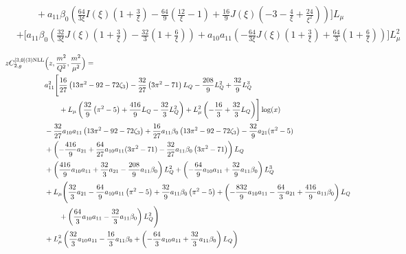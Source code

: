 \documentclass[a4paper]{article}
\begin{document}
\begin{equation}
\begin{split}
		& \qquad + a_{11} \beta_0 \left(\frac{64}{3\xi} I(\xi) \left(1 + \frac{3}{\xi}\right) - \frac{64}{9} \left(\frac{12}{\xi} - 1\right) + \frac{16}{9} J(\xi) \left(-3 - \frac{4}{\xi} + \frac{24}{\xi^2}\right)\right)\Biggr] L_\mu \\
		& + \Biggl[ a_{11} \beta_0 \left( \frac{32}{3\xi} J(\xi) \left(1 + \frac{3}{\xi}\right) - \frac{32}{3} \left(1 + \frac{6}{\xi}\right) \right)
		+ a_{10} a_{11} \left(-\frac{64}{3\xi} J(\xi) \left(1 + \frac{3}{\xi}\right) + \frac{64}{3} \left(1 + \frac{6}{\xi}\right) \right) \Biggr] L_\mu^2
	\end{split}
\end{equation}

\begin{equation}
	\begin{split}
		z C_{2,g}^{[3, 0](3) \rm NLL}&\Bigl(z,\frac{m^2}{Q^2},\frac{m^2}{\mu^2}\Bigr)= \\
		& a_{11}^2 \Biggl[\frac{16}{27} \left(13 \pi^2 -92- 72 \zeta_3\right) -\frac{32}{27} \left(3 \pi^2 - 71\right) L_Q - \frac{208}{9} L_Q^2 + \frac{32}{9} L_Q^3  \\
		& \qquad + L_\mu \left(\frac{32}{9} \left( \pi^2 - 5\right) + \frac{416}{9} L_Q - \frac{32}{3} L_Q^2 \right) + L_\mu^2 \left(-\frac{16}{3} + \frac{32}{3} L_Q\right)\Biggr] \log(x) \\
		& - \frac{32}{27} a_{10} a_{11} \left(13 \pi^2 -92- 72 \zeta_3\right) + \frac{16}{27} a_{11} \beta_0 \left(13 \pi^2 -92- 72 \zeta_3\right) -\frac{32}{9} a_{21} (\pi^2 - 5)\\
		& + \left(-\frac{416}{9} a_{21} + \frac{64}{27} a_{10} a_{11} (3 \pi^2 - 71) - \frac{32}{27} a_{11} \beta_0 \left(3 \pi^2 - 71\right)\right) L_Q \\
		& + \left( \frac{416}{9} a_{10} a_{11} + \frac{32}{3} a_{21} - \frac{208}{9} a_{11} \beta_0 \right) L_Q^2 + \left(-\frac{64}{9} a_{10} a_{11} + \frac{32}{9} a_{11} \beta_0 \right) L_Q^3 \\
		& + L_\mu \Biggl( \frac{32}{3} a_{21} - \frac{64}{9} a_{10} a_{11} \left(\pi^2 - 5\right) + \frac{32}{9} a_{11} \beta_0 \left( \pi^2 - 5\right) + \left(-\frac{832}{9} a_{10} a_{11} - \frac{64}{3} a_{21} + \frac{416}{9} a_{11} \beta_0 \right)L_Q \\
		& \qquad + \left( \frac{64}{3} a_{10} a_{11} - \frac{32}{3} a_{11} \beta_0\right) L_Q^2\Biggr) \\
		& + L_\mu^2 \left( \frac{32}{3} a_{10} a_{11} - \frac{16}{3} a_{11} \beta_0 + \left(-\frac{64}{3} a_{10} a_{11} + \frac{32}{3} a_{11} \beta_0 \right) L_Q \right)
	\end{split}
\end{equation}
\end{document}
